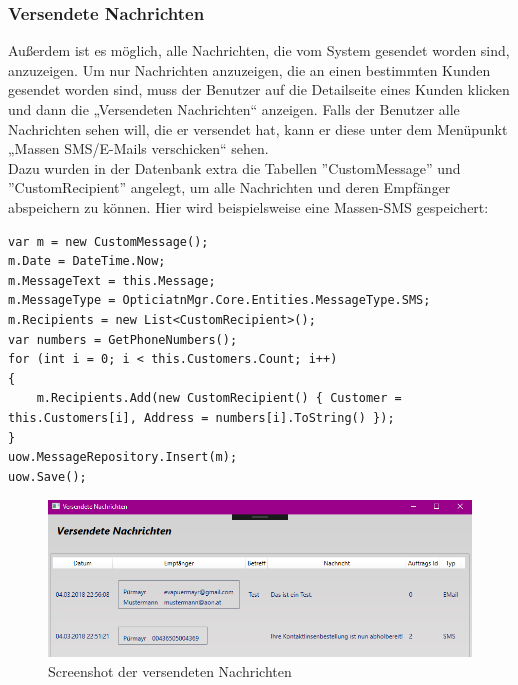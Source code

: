 \subsubsection{Versendete Nachrichten}
Außerdem ist es möglich, alle Nachrichten, die vom System gesendet worden sind, anzuzeigen. Um nur Nachrichten anzuzeigen, die an einen bestimmten Kunden gesendet worden sind, muss der Benutzer auf die Detailseite eines Kunden klicken und dann die „Versendeten Nachrichten“ anzeigen. Falls der Benutzer alle Nachrichten sehen will, die er versendet hat, kann er diese unter dem Menüpunkt „Massen SMS/E-Mails verschicken“ sehen.\\
Dazu wurden in der Datenbank extra die Tabellen ''CustomMessage'' und ''CustomRecipient'' angelegt, um alle Nachrichten und deren Empfänger abspeichern zu können. Hier wird beispielsweise eine Massen-SMS gespeichert:
\begin{lstlisting}
var m = new CustomMessage();
m.Date = DateTime.Now;
m.MessageText = this.Message;
m.MessageType = OpticiatnMgr.Core.Entities.MessageType.SMS;
m.Recipients = new List<CustomRecipient>();
var numbers = GetPhoneNumbers();
for (int i = 0; i < this.Customers.Count; i++)
{
	m.Recipients.Add(new CustomRecipient() { Customer = this.Customers[i], Address = numbers[i].ToString() });
}
uow.MessageRepository.Insert(m);
uow.Save();
\end{lstlisting}\bigskip
\begin{figure}[H]
\begin{center}
	\includegraphics[scale=.65]{images/VersendeteNachrichten.png}
\end{center}
	\caption{Screenshot der versendeten Nachrichten}
	\label{fig:sample}
\end{figure}
